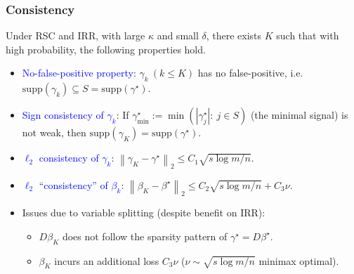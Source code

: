 \documentclass[slidestop,compress,9pt,epsfig,color]{beamer}
\theoremstyle{example}
\begin{document}
\begin{frame}
    \frametitle{Consistency}
    \begin{theorem}
        \label{thm:slbi-cstc}
        Under RSC and IRR, with large $\kappa$ and small $\delta$, there exists $K$ such that with high probability, the following properties hold.
        \begin{itemize}
            \item
                \textcolor{blue}{No-false-positive property}: $\gamma_k\ (k\le K)$ has no false-positive, i.e. $\mathrm{supp}(\gamma_k) \subseteq S = \mathrm{supp}(\gamma^{\star})$.
            \item
                \textcolor{blue}{Sign consistency of $\gamma_k$}: If $\gamma_{\min}^{\star} := \min(|\gamma_j^{\star}|:\ j\in S)$ (the minimal signal) is not weak, then $\mathrm{supp}(\gamma_K) = \mathrm{supp}(\gamma^{\star})$.
            \item
                \textcolor{blue}{$\ell_2$ consistency of $\gamma_k$}: $\left\| \gamma_K - \gamma^{\star} \right\|_2 \le C_1 \sqrt{s\log m / n}$.
            \item
                \textcolor{blue}{$\ell_2$ ``consistency'' of $\beta_k$}: $\left\| \beta_K - \beta^{\star} \right\|_2 \le C_2 \sqrt{s\log m / n} + C_3 \nu$.
        \end{itemize}
    \end{theorem}
    \begin{itemize}
        \item
            Issues due to variable splitting (despite benefit on IRR):
            \begin{itemize}
                \item
                    $D \beta_K$ does not follow the sparsity pattern of $\gamma^{\star} = D \beta^{\star}$.
                \item
                    $\beta_K$ incurs an additional loss $C_3\nu$ ($\nu \sim \sqrt{s\log m/n}$ minimax optimal).
            \end{itemize}
    \end{itemize}
\end{frame}
\end{document}
